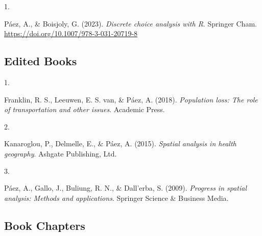 \documentclass[11pt,a4paper,]{awesome-cv}
\newlength{\cslhangindent}
\newlength{\csllabelwidth}
\newenvironment{CSLReferences}[2] %
 {\begin{list}{}{%
  \setlength{\itemindent}{0pt}
  \setlength{\leftmargin}{0pt}
  \setlength{\parsep}{0pt}
  \ifodd #1
   \setlength{\leftmargin}{\cslhangindent}
   \setlength{\itemindent}{-1\cslhangindent}
  \fi
  \setlength{\itemsep}{#2\baselineskip}}}
 {\end{list}}
\newcommand{\CSLLeftMargin}[1]{\parbox[t]{\csllabelwidth}{\strut#1\strut}}
\newcommand{\CSLRightInline}[1]{\parbox[t]{\linewidth - \csllabelwidth}{\strut#1\strut}}
\begin{document}
\label{refs-5cf02433c34c551c872e4694d767b53b}
\begin{CSLReferences}{0}{0}
\CSLLeftMargin{1. }%
\CSLRightInline{Páez, A., \& Boisjoly, G. (2023). \emph{Discrete choice
analysis with R}. Springer Cham.
\url{https://doi.org/10.1007/978-3-031-20719-8}}

\end{CSLReferences}

\subsection{Edited Books}\label{edited-books}

\label{refs-4c4fe3a0208d54385a9ff2cba1abdbdb}
\begin{CSLReferences}{0}{0}
\CSLLeftMargin{1. }%
\CSLRightInline{Franklin, R. S., Leeuwen, E. S. van, \& Páez, A. (2018).
\emph{Population loss: The role of transportation and other issues}.
Academic Press.}

\CSLLeftMargin{2. }%
\CSLRightInline{Kanaroglou, P., Delmelle, E., \& Páez, A. (2015).
\emph{Spatial analysis in health geography}. Ashgate Publishing, Ltd.}

\CSLLeftMargin{3. }%
\CSLRightInline{Páez, A., Gallo, J., Buliung, R. N., \& Dall'erba, S.
(2009). \emph{Progress in spatial analysis: Methods and applications}.
Springer Science \& Business Media.}

\end{CSLReferences}

\subsection{Book Chapters}\label{book-chapters}
\end{document}
